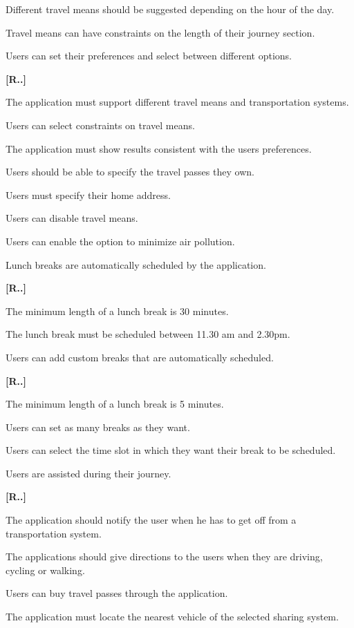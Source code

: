 \begin{list}
\begin{list}
\item Different travel means should be suggested depending on the hour of the day.
\item Travel means can have constraints on the length of their journey section.
\end{list}
\item Users can set their preferences and select between different options.
\begin{list}
	{\bfseries{}[R..]~}
	{
	}
\item The application must support different travel means and transportation systems.
\item Users can select constraints on travel means.
\item The application must show results consistent with the users preferences.
\item Users should be able to specify the travel passes they own.
\item Users must specify their home address.
	\item Users can disable travel means.
	\item Users can enable the option to minimize air pollution.
    \end{list}
\item Lunch breaks are automatically scheduled by the application.
\begin{list}
	{\bfseries{}[R..]~}
	{
	}
\item The minimum length of a lunch break is 30 minutes.
\item The lunch break must be scheduled between 11.30 am and 2.30pm.
\end{list}
\item Users can add custom breaks that are automatically scheduled.
\begin{list}
	{\bfseries{}[R..]~}
	{
	}
\item The minimum length of a lunch break is 5 minutes.
\item Users can set as many breaks as they want.
\item Users can select the time slot in which they want their break to be scheduled.
\end{list}
\item Users are assisted during their journey.
\begin{list}
	{\bfseries{}[R..]~}
	{
	}
\item The application should notify the user when he has to get off from a transportation system.
\item The applications should give directions to the users when they are driving, cycling or walking.
\item Users can buy travel passes through the application.
\item The application must locate the nearest vehicle of the selected sharing system.
\end{list}


\end{list}

